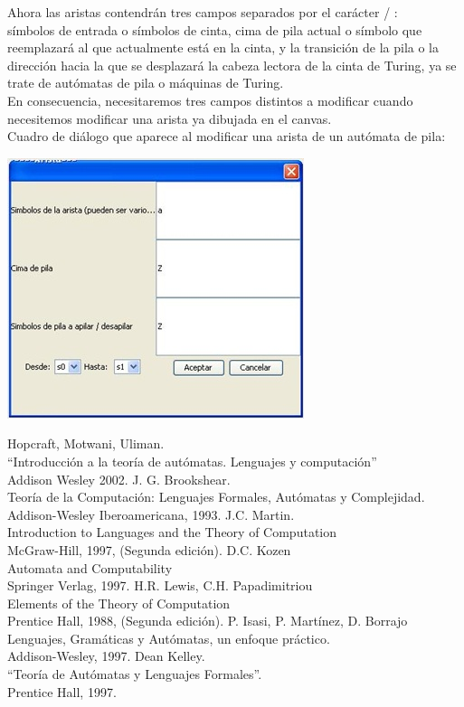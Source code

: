 \documentclass[12pt,a4paper,spanish]{book}
\begin{document}
\begin{itemize}
Ahora las aristas contendr\'an tres campos separados por el car\'acter / :\\ 
s\'imbolos de entrada o s\'imbolos de cinta, cima de pila actual o s\'imbolo que reemplazar\'a al que actualmente est\'a en la cinta, y la transici\'on de la pila o la direcci\'on hacia la que se desplazar\'a la cabeza lectora de la cinta de Turing, ya se trate de aut\'omatas de pila o m\'aquinas de Turing.\\ En consecuencia, necesitaremos tres campos distintos a modificar cuando necesitemos modificar una arista ya dibujada en el canvas.\\

Cuadro de di\'alogo que aparece al modificar una arista de un aut\'omata de pila:\\
\begin{center}
\includegraphics{roci6.jpg}
\end{center}
\end{itemize}

\begin{thebibliography}{XXX}
\bibitem{}Hopcraft, Motwani, Uliman.\\
``Introducci\'on a la teor\'ia de aut\'omatas. Lenguajes y computaci\'on''\\
Addison Wesley 2002.
\bibitem{}J. G. Brookshear.\\
Teor\'ia de la Computaci\'on: Lenguajes Formales, Aut\'omatas y Complejidad.\\
Addison-Wesley Iberoamericana, 1993.
\bibitem{}J.C. Martin.\\
Introduction to Languages and the Theory of Computation\\
McGraw-Hill, 1997, (Segunda edici\'on).
\bibitem{}D.C. Kozen\\
Automata and Computability\\
Springer Verlag, 1997.
\bibitem{}H.R. Lewis, C.H. Papadimitriou\\
Elements of the Theory of Computation\\
Prentice Hall, 1988, (Segunda edici\'on).
\bibitem{}P. Isasi, P. Mart\'inez, D. Borrajo\\
Lenguajes, Gram\'aticas y Aut\'omatas, un enfoque pr\'actico.\\
Addison-Wesley, 1997.
\bibitem{}Dean Kelley.\\
``Teor\'ia de Aut\'omatas y Lenguajes Formales''.\\
Prentice Hall, 1997.
\bibitem{}
\end{thebibliography}
\end{document}
